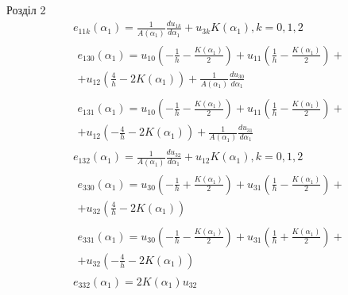\documentclass[8pt]{beamer}
\numberwithin{figure}{section}
\numberwithin{equation}{section}
\begin{document}
\begin{frame}{Розділ 2}
\begin{equation}\label{eq:sqt_strain_l}
\begin{aligned}
&e_{11k}\left(\alpha_1\right)=\frac{1}{A\left(\alpha_1\right)}\frac{du_{1k}}{d\alpha_1}+u_{3k}K\left(\alpha_1\right), k=0,1,2
\\
&\begin{split}
e_{130}\left(\alpha_1\right)=u_{10}\left( -\frac{1}{h}-\frac{K\left( \alpha_1 \right)}{2} \right)+u_{11}\left( \frac{1}{h}-\frac{K\left( \alpha_1 \right)}{2} \right)+ \\ +u_{12}\left( \frac{4}{h}-2K\left( \alpha_1 \right) \right) + \frac{1}{A\left(\alpha_1\right)}\frac{du_{30}}{d\alpha_1}
\end{split}\\
&\begin{split}
e_{131}\left(\alpha_1\right)=u_{10}\left( -\frac{1}{h}-\frac{K\left( \alpha_1 \right)}{2} \right)+u_{11}\left( \frac{1}{h}-\frac{K\left( \alpha_1 \right)}{2} \right)+\\+u_{12}\left( - \frac{4}{h}-2K\left( \alpha_1 \right) \right) + \frac{1}{A\left(\alpha_1\right)}\frac{du_{31}}{d\alpha_1}
\end{split}\\
&e_{132}\left(\alpha_1\right)=\frac{1}{A\left(\alpha_1\right)}\frac{du_{32}}{d\alpha_1}+u_{12}K\left(\alpha_1\right), k=0,1,2\\
&\begin{split}
e_{330}\left(\alpha_1\right)=u_{30}\left( -\frac{1}{h}+\frac{K\left( \alpha_1 \right)}{2} \right)+u_{31}\left( \frac{1}{h}-\frac{K\left( \alpha_1 \right)}{2} \right)+\\+u_{32}\left( \frac{4}{h}-2K\left( \alpha_1 \right) \right)
\end{split}\\
&\begin{split}
e_{331}\left(\alpha_1\right)=u_{30}\left( -\frac{1}{h}-\frac{K\left( \alpha_1 \right)}{2} \right)+u_{31}\left( \frac{1}{h}+\frac{K\left( \alpha_1 \right)}{2} \right)+\\+u_{32}\left( -\frac{4}{h}-2K\left( \alpha_1 \right) \right)
\end{split}\\
&e_{332}\left(\alpha_1\right)=2K\left( \alpha_1 \right)u_{32}
\end{aligned}
\end{equation}
\end{frame}
\end{document}

